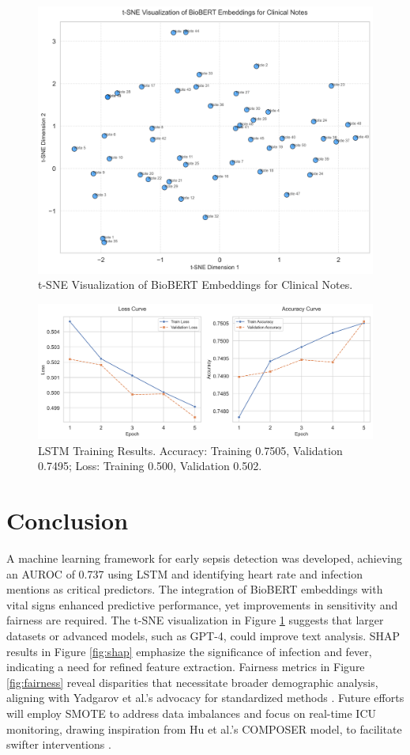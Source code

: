 \documentclass[journal]{IEEEtran}
\begin{document}
\begin{figure}[H]
    \centering
    \includegraphics[width=0.8\columnwidth]{biobert_tsne_embeddings.png}
    \caption{t-SNE Visualization of BioBERT Embeddings for Clinical Notes.}
    \label{fig:tsne}
\end{figure}

\begin{figure}[H]
    \centering
    \includegraphics[width=0.8\columnwidth]{training_history.png}
    \caption{LSTM Training Results. Accuracy: Training 0.7505, Validation 0.7495; Loss: Training 0.500, Validation 0.502.}
    \label{fig:curves}
\end{figure}

\section{Conclusion}
A machine learning framework for early sepsis detection was developed, achieving an AUROC of 0.737 using LSTM and identifying heart rate and infection mentions as critical predictors. The integration of BioBERT embeddings with vital signs enhanced predictive performance, yet improvements in sensitivity and fairness are required. The t-SNE visualization in Figure \ref{fig:tsne} suggests that larger datasets or advanced models, such as GPT-4, could improve text analysis. SHAP results in Figure \ref{fig:shap} emphasize the significance of infection and fever, indicating a need for refined feature extraction. Fairness metrics in Figure \ref{fig:fairness} reveal disparities that necessitate broader demographic analysis, aligning with Yadgarov et al.’s advocacy for standardized methods \cite{yadgarov2024early}. Future efforts will employ SMOTE to address data imbalances and focus on real-time ICU monitoring, drawing inspiration from Hu et al.’s COMPOSER model, to facilitate swifter interventions \cite{hu2024impact}.



\end{document}
